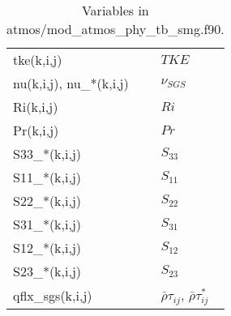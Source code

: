 \begin{table}[htbp]
  \caption{Variables in atmos/mod\_atmos\_phy\_tb\_smg.f90.}
  \begin{tabular}{ll}\hline
    tke(k,i,j) & $TKE$ \\
    nu(k,i,j), nu\_*(k,i,j) & $\nu_{SGS}$ \\
    Ri(k,i,j) & $Ri$ \\
    Pr(k,i,j) & $Pr$ \\
    S33\_*(k,i,j) & $S_{33}$ \\
    S11\_*(k,i,j) & $S_{11}$ \\
    S22\_*(k,i,j) & $S_{22}$ \\
    S31\_*(k,i,j) & $S_{31}$ \\
    S12\_*(k,i,j) & $S_{12}$ \\
    S23\_*(k,i,j) & $S_{23}$ \\
    qflx\_sgs(k,i,j) & $\bar{\rho}\tau_{ij}$, $\bar{\rho}\tau^*_{ij}$ \\
  \hline\end{tabular}
\end{table}
